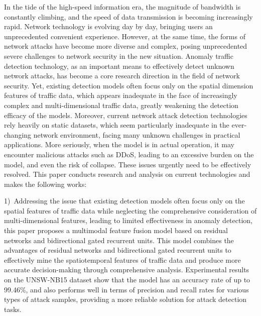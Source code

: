 \begin{eabstract} 

    In the tide of the high-speed information era, the magnitude of bandwidth is constantly climbing, and the speed of data transmission is becoming increasingly rapid. Network technology is evolving day by day, bringing users an unprecedented convenient experience. However, at the same time, the forms of network attacks have become more diverse and complex, posing unprecedented severe challenges to network security in the new situation. Anomaly traffic detection technology, as an important means to effectively detect unknown network attacks, has become a core research direction in the field of network security. Yet, existing detection models often focus only on the spatial dimension features of traffic data, which appears inadequate in the face of increasingly complex and multi-dimensional traffic data, greatly weakening the detection efficacy of the models. Moreover, current network attack detection technologies rely heavily on static datasets, which seem particularly inadequate in the ever-changing network environment, facing many unknown challenges in practical applications. More seriously, when the model is in actual operation, it may encounter malicious attacks such as DDoS, leading to an excessive burden on the model, and even the risk of collapse. These issues urgently need to be effectively resolved. This paper conducts research and analysis on current technologies and makes the following works:

    1)~Addressing the issue that existing detection models often focus only on the spatial features of traffic data while neglecting the comprehensive consideration of multi-dimensional features, leading to limited effectiveness in anomaly detection, this paper proposes a multimodal feature fusion model based on residual networks and bidirectional gated recurrent units. This model combines the advantages of residual networks and bidirectional gated recurrent units to effectively mine the spatiotemporal features of traffic data and produce more accurate decision-making through comprehensive analysis. Experimental results on the UNSW-NB15 dataset show that the model has an accuracy rate of up to 99.46\%, and also performs well in terms of precision and recall rates for various types of attack samples, providing a more reliable solution for attack detection tasks.
    

\end{eabstract}
